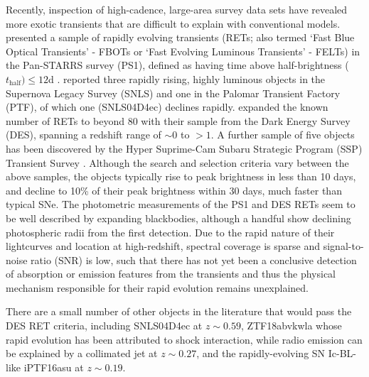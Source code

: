\documentclass[fleqn,usenatbib,]{mnras}
\newcommand{\replyref}[1]{\color{magenta}#1 \color{black}}
\begin{document}
Recently, inspection of high-cadence, large-area survey data sets have revealed more exotic transients that are difficult to explain with conventional models. \citet{Drout2014} presented a sample of rapidly evolving transients (RETs; also termed `Fast Blue Optical Transients' - FBOTs or `Fast Evolving Luminous Transients' - FELTs) in the Pan-STARRS survey (PS1), \replyref{defined as having time above half-brightness ($t_{\mathrm{half}}) \leq12$d}. \citet{Arcavi2016} reported three rapidly rising, highly luminous objects in the Supernova Legacy Survey (SNLS) and one in the Palomar Transient Factory (PTF), of which one (SNLS04D4ec) declines rapidly. \citet[hereafter P18]{Pursiainen2018} expanded the known number of RETs to beyond 80 with their sample from the Dark Energy Survey (DES), spanning a redshift range of $\sim 0$ to $>1$. A further sample of five objects has been discovered by the Hyper Suprime-Cam Subaru Strategic Program (SSP) Transient Survey \citep{Tampo2020}. \replyref{Although the search and selection criteria vary between the above samples, the objects} typically rise to peak brightness in less than 10 days, and decline to 10\% of their peak brightness within 30 days, much faster than typical SNe. The photometric measurements of the PS1 and DES RETs seem to be well described by expanding blackbodies, although a handful show declining photospheric radii from the first detection. Due to the rapid nature of their lightcurves and location at high-redshift, spectral coverage is sparse and signal-to-noise ratio (SNR) is low, such that there has not yet been a conclusive detection of absorption or emission features from the transients and thus the physical mechanism responsible for their rapid evolution remains unexplained.

There are a small number of other objects in the literature that would pass the DES RET criteria, including SNLS04D4ec \citep{Arcavi2016} at $z\sim0.59$, ZTF18abvkwla \replyref{whose rapid evolution has been attributed to shock interaction, while radio emission can be explained by a collimated jet \citep{Ho2020} at $z\sim0.27$, and the rapidly-evolving SN Ic-BL-like iPTF16asu \citep{Whitesides2017} at $z\sim0.19$. }
\end{document}
